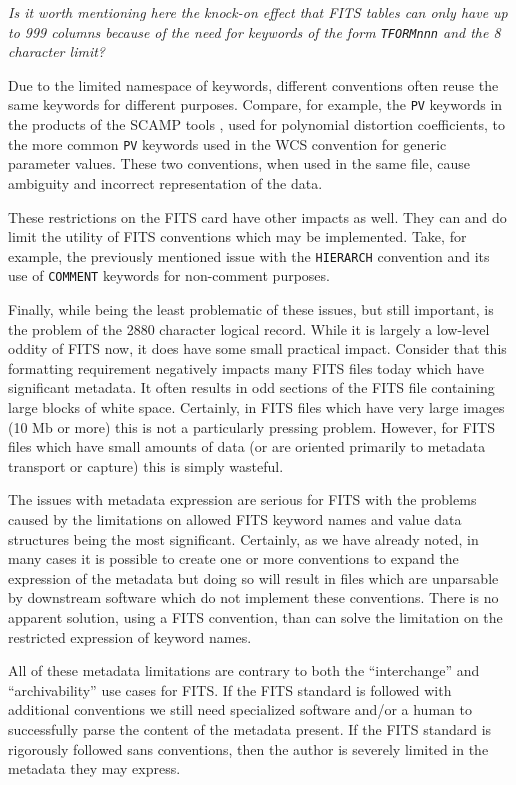 \documentclass[final,authoryear,5p,times,twocolumn]{elsarticle}
\begin{document}
\textit{\color{red} Is it worth mentioning here the knock-on effect that FITS
tables can only have up to 999 columns because of the need for keywords of the
form \texttt{TFORMnnn} and the 8 character limit?}

Due to the limited namespace of keywords, different conventions often
reuse the same keywords for different purposes.  Compare, for example,
the \texttt{PV} keywords in the products of the SCAMP tools
\cite{2006ASPC..351..112B}, used for polynomial distortion coefficients, to the more
common \texttt{PV} keywords used in the WCS convention for generic
parameter values.  These two conventions, when used in the same file,
cause ambiguity and incorrect representation of the data.

These restrictions on the FITS card have other impacts as well. They
can and do limit the utility of FITS conventions which may be
implemented. Take, for example, the previously mentioned issue with
the \texttt{HIERARCH} convention and its use of \texttt{COMMENT}
keywords for non-comment purposes.


Finally, while being the least problematic of these issues, but still
important, is the problem of the 2880 character logical record. While
it is largely a low-level oddity of FITS now, it does have some small
practical impact. Consider that this formatting requirement negatively
impacts many FITS files today which have significant metadata. It
often results in odd sections of the FITS file containing large blocks
of white space. Certainly, in FITS files which have very large images
(10 Mb or more) this is not a particularly pressing
problem. However, for FITS files which have small amounts of data (or
are oriented primarily to metadata transport or capture) this is
simply wasteful.


The issues with metadata expression are serious for FITS with the
problems caused by the limitations on allowed FITS keyword names and
value data structures being the most significant. Certainly, as we
have already noted, in many cases it is possible to create one or more
conventions to expand the expression of the metadata but doing so will
result in files which are unparsable by downstream software which
do not implement these conventions. There is no apparent solution,
using a FITS convention, than can solve the limitation on the
restricted expression of keyword names.


All of these metadata limitations are contrary to both the
``interchange'' and ``archivability'' use cases for FITS. If the FITS
standard is followed with additional conventions we still need
specialized software and/or a human to successfully parse the content
of the metadata present. If the FITS standard is rigorously followed
sans conventions, then the author is severely limited in the metadata
they may express.
\end{document}
